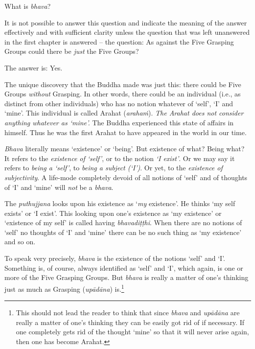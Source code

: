 What is \textit{bhava}?

It is not possible to answer this question and indicate the meaning of the answer effectively and with sufficient clarity unless the question that was left unanswered in the first chapter is answered -- the question: As against the Five Grasping Groups could there be \emph{just} the Five Groups?

The answer is: Yes.

The unique discovery that the Buddha made was just this: there could be Five Groups \emph{without} Grasping. In other words, there could be an individual (i.e., as distinct from other individuals) who has no notion whatever of `self', `I' and `mine'. This individual is called Arahat (\textit{arahaṁ}). \emph{The Arahat does not consider anything whatever as `mine'.} The Buddha experienced this state of affairs in himself. Thus he was the first Arahat to have appeared in the world in our time.

\emph{Bhava} literally means `existence' or `being'. But existence of what? Being what? It refers to the \emph{existence of `self'}, or to the notion \emph{`I exist'}. Or we may say it refers to \emph{being a `self'}, to \emph{being a subject (`I')}. Or yet, to the \emph{existence of subjectivity}. A life-mode completely devoid of all notions of `self' and of thoughts of `I' and `mine' will \emph{not} be a \emph{bhava}.

The \textit{puthujjana} looks upon his existence as `\emph{my} existence'. He thinks `my self exists' or `I exist'. This looking upon one's existence as `my existence' or `existence of my self' is called having \textit{bhavadiṭṭhi}. When there are no notions of `self' no thoughts of `I' and `mine' there can be no such thing as `my existence' and so on.

To speak very precisely, \textit{bhava} is the existence of the notions `self' and `I'. Something is, of course, always identified as `self' and `I', which again, is one or more of the Five Grasping Groups. But \textit{bhava} is really a matter of one's thinking just as much as Grasping (\textit{upādāna}) is.\footnote{This should not lead the reader to think that since \textit{bhava} and \textit{upādāna} are really a matter of one's thinking they can be easily got rid of if necessary. If one completely gets rid of the thought `mine' so that it will never arise again, then one has become Arahat.}


